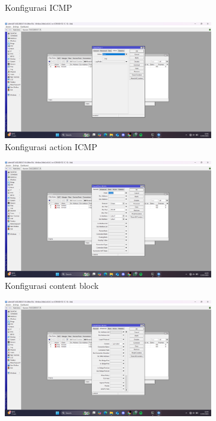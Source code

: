 \begin{enumerate}
\begin{figure}[H]
\begin{subfigure}[b]{0.4\linewidth}
			\caption{Konfigurasi ICMP\label{fig:konfigurasiR1}}
		\end{subfigure}
		\begin{subfigure}[b]{0.4\linewidth}
			\centering
			\includegraphics[width=\linewidth]{P4/img/firewall (3).png}
			\caption{Konfigurasi action ICMP\label{fig:konfigurasiR2}}
		\end{subfigure}
		\begin{subfigure}[b]{0.4\linewidth}
			\centering
			\includegraphics[width=\linewidth]{P4/img/firewall (4).png}
			\caption{Konfigurasi content block\label{fig:konfigurasiR1}}
		\end{subfigure}
		\begin{subfigure}[b]{0.4\linewidth}
			\centering
			\includegraphics[width=\linewidth]{P4/img/firewall (5).png}

\end{subfigure}
\end{figure}
\end{enumerate}
